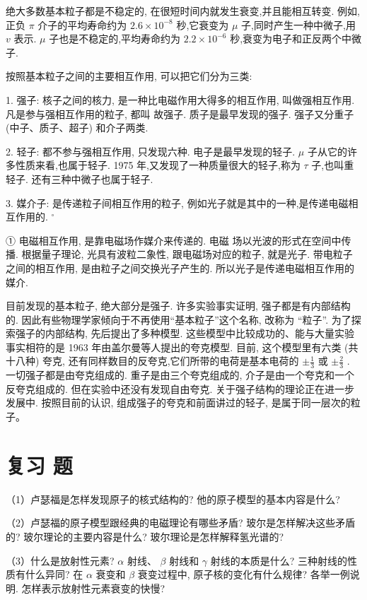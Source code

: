 \documentclass[10pt]{article}
\begin{document}
绝大多数基本粒子都是不稳定的, 在很短时间内就发生衰变,并且能相互转变. 例如,正负 \(\pi\) 介子的平均寿命约为 \({2.6} \times {10}^{-8}\) 秒,它衰变为 \(\mu\) 子,同时产生一种中微子,用 \(v\) 表示. \(\mu\) 子也是不稳定的,平均寿命约为 \({2.2} \times {10}^{-6}\) 秒,衰变为电子和正反两个中微子.

按照基本粒子之间的主要相互作用, 可以把它们分为三类:

1. 强子: 核子之间的核力, 是一种比电磁作用大得多的相互作用, 叫做强相互作用. 凡是参与强相互作用的粒子, 都叫 故强子. 质子是最早发现的强子. 强子又分重子 (中子、质子、超子) 和介子两类.

2. 轻子: 都不参与强相互作用, 只发现六种. 电子是最早发现的轻子. \(\mu\) 子从它的许多性质来看,也属于轻子. 1975 年,又发现了一种质量很大的轻子,称为 \(\tau\) 子,也叫重轻子. 还有三种中微子也属于轻子.

3. 媒介子: 是传递粒子间相互作用的粒子, 例如光子就是其中的一种,是传递电磁相互作用的. \({}^{ \circ }\)

① 电磁相互作用, 是靠电磁场作媒介来传递的. 电磁 场以光波的形式在空间中传播. 根据量子理论, 光具有波粒二象性, 跟电磁场对应的粒子, 就是光子. 带电粒子之间的相互作用, 是由粒子之间交换光子产生的. 所以光子是传递电磁相互作用的媒介.

目前发现的基本粒子, 绝大部分是强子. 许多实验事实证明, 强子都是有内部结构的. 因此有些物理学家倾向于不再使用“基本粒子”这个名称, 改称为 “粒子”. 为了探索强子的内部结构, 先后提出了多种模型. 这些模型中比较成功的、能与大量实验事实相符的是 1963 年由盖尔曼等人提出的夸克模型. 目前, 这个模型里有六类 (共十八种) 夸克, 还有同样数目的反夸克,它们所带的电荷是基本电荷的 \(\pm \frac{1}{3}\) 或 \(\pm \frac{2}{3}\) . 一切强子都是由夸克组成的. 重子是由三个夸克组成的, 介子是由一个夸克和一个反夸克组成的. 但在实验中还没有发现自由夸克. 关于强子结构的理论正在进一步发展中. 按照目前的认识, 组成强子的夸克和前面讲过的轻子, 是属于同一层次的粒子。

\section*{复习 题}

（1）卢瑟福是怎样发现原子的核式结构的? 他的原子模型的基本内容是什么?

（2）卢瑟福的原子模型跟经典的电磁理论有哪些矛盾? 玻尔是怎样解决这些矛盾的? 玻尔理论的主要内容是什么? 玻尔理论是怎样解释氢光谱的?

（3）什么是放射性元素? \(\alpha\) 射线、 \(\beta\) 射线和 \(\gamma\) 射线的本质是什么? 三种射线的性质有什么异同? 在 \(\alpha\) 衰变和 \(\beta\) 衰变过程中, 原子核的变化有什么规律? 各举一例说明. 怎样表示放射性元素衰变的快慢?
\end{document}
